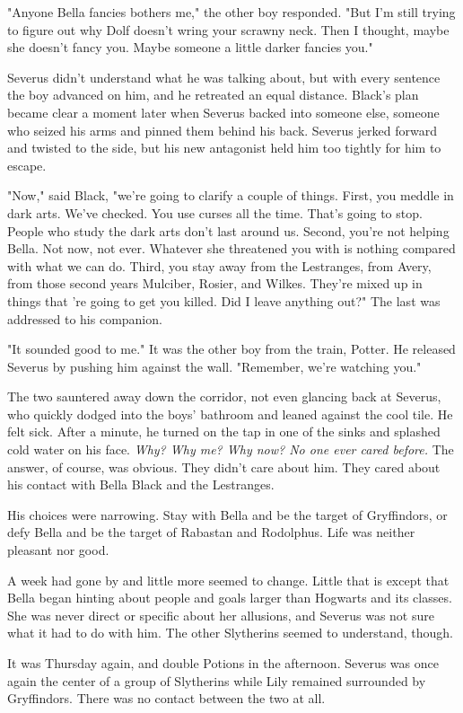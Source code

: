 \documentclass[a4paper,11pt]{article}
\begin{document}
"Anyone Bella fancies bothers me," the other boy responded. "But I'm still trying to figure out why Dolf doesn't wring your scrawny neck. Then I thought, maybe she doesn't fancy you. Maybe someone a little darker fancies you."

Severus didn't understand what he was talking about, but with every sentence the boy advanced on him, and he retreated an equal distance. Black's plan became clear a moment later when Severus backed into someone else, someone who seized his arms and pinned them behind his back. Severus jerked forward and twisted to the side, but his new antagonist held him too tightly for him to escape.

"Now," said Black, "we're going to clarify a couple of things. First, you meddle in dark arts. We've checked. You use curses all the time. That's going to stop. People who study the dark arts don't last around us. Second, you're not helping Bella. Not now, not ever. Whatever she threatened you with is nothing compared with what we can do. Third, you stay away from the Lestranges, from Avery, from those second years Mulciber, Rosier, and Wilkes. They're mixed up in things that 're going to get you killed. Did I leave anything out?" The last was addressed to his companion.

"It sounded good to me." It was the other boy from the train, Potter. He released Severus by pushing him against the wall. "Remember, we're watching you."

The two sauntered away down the corridor, not even glancing back at Severus, who quickly dodged into the boys' bathroom and leaned against the cool tile. He felt sick. After a minute, he turned on the tap in one of the sinks and splashed cold water on his face. \emph{Why? Why me? Why now? No one ever cared before. }The answer, of course, was obvious. They didn't care about him. They cared about his contact with Bella Black and the Lestranges.

His choices were narrowing. Stay with Bella and be the target of Gryffindors, or defy Bella and be the target of Rabastan and Rodolphus. Life was neither pleasant nor good.

A week had gone by and little more seemed to change. Little that is except that Bella began hinting about people and goals larger than Hogwarts and its classes. She was never direct or specific about her allusions, and Severus was not sure what it had to do with him. The other Slytherins seemed to understand, though.

It was Thursday again, and double Potions in the afternoon. Severus was once again the center of a group of Slytherins while Lily remained surrounded by Gryffindors. There was no contact between the two at all.
\end{document}
